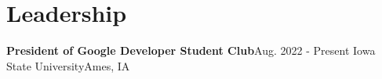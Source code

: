 \section{Leadership}

    \resumeSubHeadingListStart
      \resumeSubheading
          {\textbf{President of Google Developer Student Club}}{Aug. 2022 - Present}
          {Iowa State University}{Ames, IA}
        \resumeItemListStart
        \resumeItemListEnd
    \resumeSubHeadingListEnd
